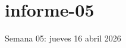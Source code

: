 \documentclass[./informes.tex]{subfiles}
\begin{document}
\chapter{informe-05}

Semana 05: jueves 16 abril 2026







\printbibliography[
  heading=subbibliography
]
\end{document}
